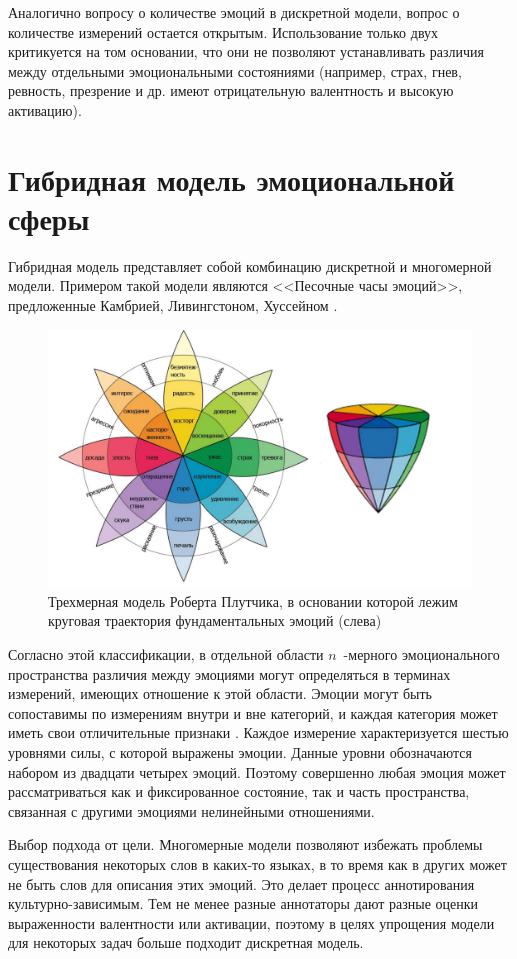 Аналогично вопросу о количестве эмоций в дискретной модели, вопрос о количестве измерений остается открытым. Использование только двух критикуется на том основании, что они не позволяют устанавливать различия между отдельными эмоциональными состояниями (например, страх, гнев, ревность, презрение и др. имеют отрицательную валентность и высокую активацию).

\section{Гибридная модель эмоциональной сферы}
Гибридная модель представляет собой комбинацию дискретной и многомерной модели. Примером такой модели являются <<Песочные часы эмоций>>, предложенные Камбрией, Ливингстоном, Хуссейном \cite{hourglass}. 
\begin{figure}[H]
	\centering
	\includegraphics[width=0.8\linewidth]{assets/hourglass.pdf}
	\caption{Трехмерная модель Роберта Плутчика, в основании которой лежим круговая траектория фундаментальных эмоций (слева)}
	\label{fig:hourglass}
\end{figure}

Согласно этой классификации, в отдельной области $n$~-мерного эмоционального пространства различия между эмоциями могут определяться в терминах измерений, имеющих отношение к этой области. Эмоции могут быть сопоставимы по измерениям внутри и вне категорий, и каждая категория может иметь свои отличительные признаки \cite{Russell2003}. Каждое измерение характеризуется шестью уровнями силы, с которой выражены эмоции. Данные уровни обозначаются набором из двадцати четырех эмоций. Поэтому совершенно любая эмоция может рассматриваться как и фиксированное состояние, так и часть пространства, связанная с другими эмоциями нелинейными отношениями. 

Выбор подхода от цели. Многомерные модели позволяют избежать проблемы существования  некоторых слов в каких-то языках, в то время как в других может не быть слов для описания этих эмоций. Это делает процесс аннотирования культурно-зависимым. Тем не менее разные аннотаторы дают разные оценки выраженности валентности или активации, поэтому в целях упрощения модели для некоторых задач больше подходит дискретная модель.

